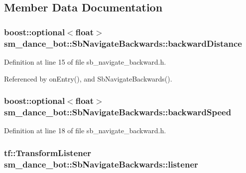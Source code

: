 \subsection{Member Data Documentation}
\subsubsection[{\texorpdfstring{backward\+Distance}{backwardDistance}}]{\setlength{\rightskip}{0pt plus 5cm}boost\+::optional$<$float$>$ sm\+\_\+dance\+\_\+bot\+::\+Sb\+Navigate\+Backwards\+::backward\+Distance}\hypertarget{classsm__dance__bot_1_1SbNavigateBackwards_a521e30a8947d54e0c16b6ed87d01a89f}{}\label{classsm__dance__bot_1_1SbNavigateBackwards_a521e30a8947d54e0c16b6ed87d01a89f}


Definition at line 15 of file sb\+\_\+navigate\+\_\+backward.\+h.



Referenced by on\+Entry(), and Sb\+Navigate\+Backwards().

\subsubsection[{\texorpdfstring{backward\+Speed}{backwardSpeed}}]{\setlength{\rightskip}{0pt plus 5cm}boost\+::optional$<$float$>$ sm\+\_\+dance\+\_\+bot\+::\+Sb\+Navigate\+Backwards\+::backward\+Speed}\hypertarget{classsm__dance__bot_1_1SbNavigateBackwards_a4ca7e1298b1a66241e60768831d6920b}{}\label{classsm__dance__bot_1_1SbNavigateBackwards_a4ca7e1298b1a66241e60768831d6920b}


Definition at line 18 of file sb\+\_\+navigate\+\_\+backward.\+h.

\subsubsection[{\texorpdfstring{listener}{listener}}]{\setlength{\rightskip}{0pt plus 5cm}tf\+::\+Transform\+Listener sm\+\_\+dance\+\_\+bot\+::\+Sb\+Navigate\+Backwards\+::listener}\hypertarget{classsm__dance__bot_1_1SbNavigateBackwards_aa7ad50d23859f1e19da82d82c9d3ece1}{}\label{classsm__dance__bot_1_1SbNavigateBackwards_aa7ad50d23859f1e19da82d82c9d3ece1}



